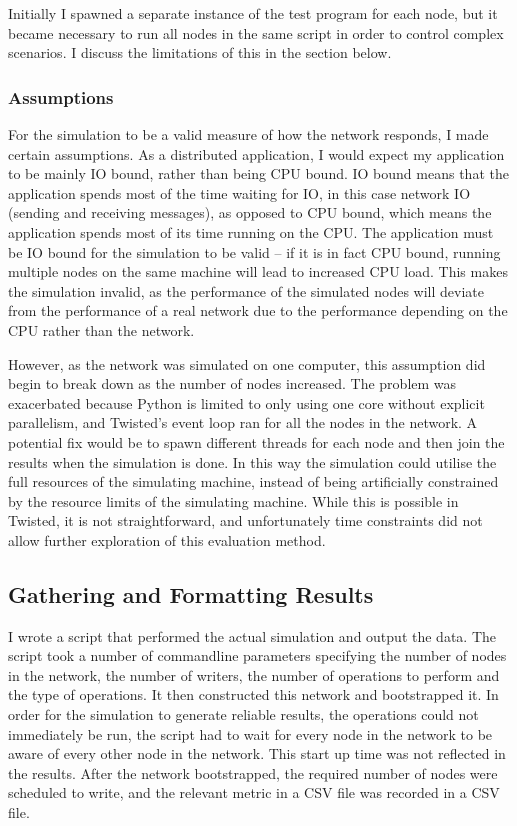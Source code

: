 \documentclass[12pt,twoside,notitlepage]{report}
\begin{document}
Initially I spawned a separate instance of the test program for each node, but it became necessary
to run all nodes in the same script in order to control complex scenarios. I discuss the
limitations of this in the section below.

\subsubsection*{Assumptions}

For the simulation to be a valid measure of how the network responds, I made certain assumptions.
As a distributed application, I would expect my application to be mainly IO bound, rather than
being CPU bound. IO bound means that the application spends most of the time waiting for IO, in
this case network IO (sending and receiving messages), as opposed to CPU bound, which means the
application spends most of its time running on the CPU. The application must be IO bound for the
simulation to be valid -- if it is in fact CPU bound, running multiple nodes on the same machine
will lead to increased CPU load. This makes the simulation invalid, as the performance of the
simulated nodes will deviate from the performance of a real network due to the performance
depending on the CPU rather than the network.

However, as the network was simulated on one computer, this assumption did begin to break down as the
number of nodes increased. The problem was exacerbated because Python is limited to only using
one core without explicit parallelism, and Twisted's event loop ran for all the nodes in the
network. A potential fix would be to spawn different threads for each node and then join the
results when the simulation is done. In this way the simulation could utilise the full resources
of the simulating machine, instead of being artificially constrained by the resource limits of the
simulating machine. While this is possible in Twisted, it is not straightforward, and
unfortunately time constraints did not allow further exploration of this evaluation method.

\subsection{Gathering and Formatting Results}

I wrote a script that performed the actual simulation and output the data. The script took a
number of commandline parameters specifying the number of nodes in the network, the number of
writers, the number of operations to perform and the type of operations. It then constructed this
network and bootstrapped it. In order for the simulation to generate reliable results, the
operations could not immediately be run, the script had to wait for every node in the network
to be aware of every other node in the network. This start up time was not reflected in the
results. After the network bootstrapped, the required number of nodes were scheduled to write,
and the relevant metric in a CSV file was recorded in a CSV file.
\end{document}
